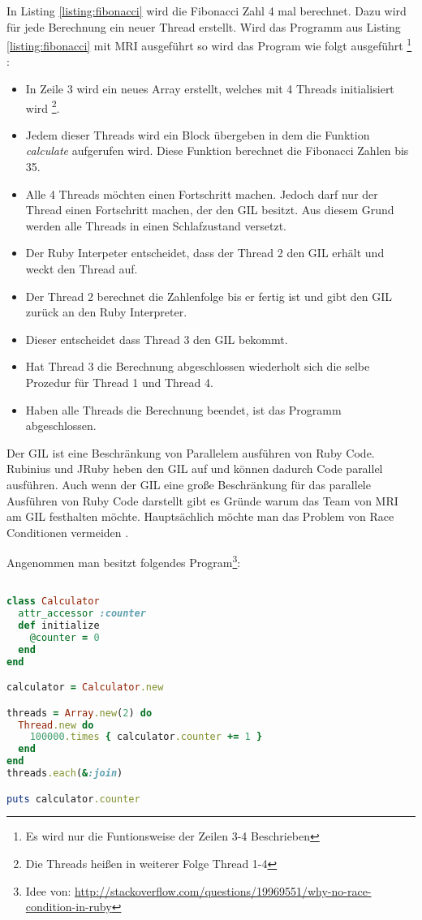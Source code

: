 In Listing \ref{listing:fibonacci} wird die Fibonacci Zahl 4 mal berechnet. Dazu wird für jede Berechnung ein neuer Thread erstellt. Wird das Programm aus Listing \ref{listing:fibonacci} mit MRI ausgeführt so wird das Program wie folgt ausgeführt \footnote{Es wird nur die Funtionsweise der Zeilen 3-4 Beschrieben} \cite[p. 45-46]{Sto2013}: 

\begin{itemize}
  \item In Zeile 3 wird ein neues Array erstellt, welches mit 4 Threads initialisiert wird \footnote{Die Threads heißen in weiterer Folge Thread 1-4}.
  \item Jedem dieser Threads wird ein Block übergeben in dem die Funktion \emph{calculate} aufgerufen wird. Diese Funktion berechnet die Fibonacci Zahlen bis 35.
  \item Alle 4 Threads möchten einen Fortschritt machen. Jedoch darf nur der Thread einen Fortschritt machen, der den GIL besitzt. Aus diesem Grund werden alle Threads in einen Schlafzustand versetzt.
  \item Der Ruby Interpeter entscheidet, dass der Thread 2 den GIL erhält und weckt den Thread auf.
  \item Der Thread 2 berechnet die Zahlenfolge bis er fertig ist und gibt den GIL zurück an den Ruby Interpreter.
  \item Dieser entscheidet dass Thread 3 den GIL bekommt.
  \item Hat Thread 3 die Berechnung abgeschlossen wiederholt sich die selbe Prozedur für Thread 1 und Thread 4.
  \item Haben alle Threads die Berechnung beendet, ist das Programm abgeschlossen.
\end{itemize}

Der GIL ist eine Beschränkung von Parallelem ausführen von Ruby Code. Rubinius und JRuby heben den GIL auf und können dadurch Code parallel ausführen. Auch wenn der GIL eine große Beschränkung für das parallele Ausführen von Ruby Code darstellt gibt es Gründe warum das Team von MRI am GIL festhalten möchte. Hauptsächlich möchte man das Problem von Race Conditionen vermeiden \cite[p. 48-49]{Sto2013}.

Angenommen man besitzt folgendes Program\footnote{Idee von: \url{http://stackoverflow.com/questions/19969551/why-no-race-condition-in-ruby}}: 

\begin{lstlisting}[language=Ruby,label={listing:race condition}]

class Calculator
  attr_accessor :counter
  def initialize
    @counter = 0
  end
end

calculator = Calculator.new

threads = Array.new(2) do
  Thread.new do
    100000.times { calculator.counter += 1 }
  end
end
threads.each(&:join)

puts calculator.counter

\end{lstlisting}

